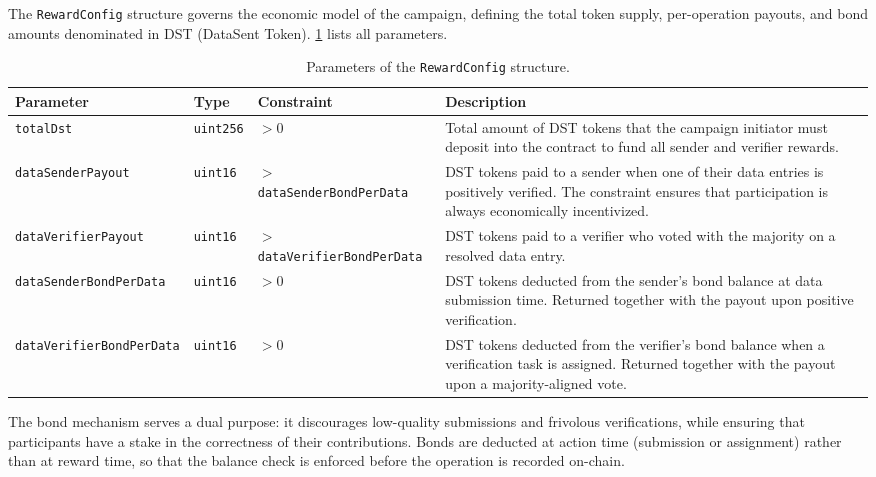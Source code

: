 The \texttt{RewardConfig} structure governs the economic model of the campaign, defining the total token supply, per-operation payouts, and bond amounts denominated in DST (DataSent Token).
\ref{tab:params-rewards} lists all parameters.
\begin{table}
    \centering
    \caption{Parameters of the \texttt{RewardConfig} structure.}
    \label{tab:params-rewards}
    \small
    \begin{tabular}{p{3.8cm} l p{2.8cm} p{4.8cm}}
        \hline
        \textbf{Parameter} & \textbf{Type} & \textbf{Constraint} & \textbf{Description} \\
        \hline
        \texttt{totalDst}
        & \texttt{uint256}
        & $> 0$
        & Total amount of DST tokens that the campaign initiator must deposit into the contract to fund all sender and verifier rewards. \\[6pt]

        \texttt{dataSenderPayout}
        & \texttt{uint16}
        & $>$ \texttt{dataSender\-BondPerData}
        & DST tokens paid to a sender when one of their data entries is positively verified.
        The constraint ensures that participation is always economically incentivized. \\[6pt]

        \texttt{dataVerifierPayout}
        & \texttt{uint16}
        & $>$ \texttt{dataVerifier\-BondPerData}
        & DST tokens paid to a verifier who voted with the majority on a resolved data entry. \\[6pt]

        \texttt{dataSenderBond\-PerData}
        & \texttt{uint16}
        & $> 0$
        & DST tokens deducted from the sender's bond balance at data submission time.
        Returned together with the payout upon positive verification. \\[6pt]

        \texttt{dataVerifierBond\-PerData}
        & \texttt{uint16}
        & $> 0$
        & DST tokens deducted from the verifier's bond balance when a verification task is assigned.
        Returned together with the payout upon a majority-aligned vote. \\
        \hline
    \end{tabular}
\end{table}

The bond mechanism serves a dual purpose: it discourages low-quality submissions and frivolous verifications, while ensuring that participants have a stake in the correctness of their contributions.
Bonds are deducted at action time (submission or assignment) rather than at reward time, so that the balance check is enforced before the operation is recorded on-chain.


